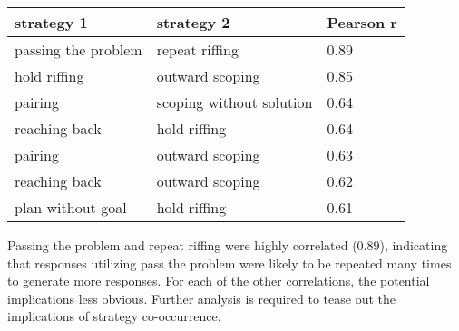 \begin{table}
    \begin{tabular}{l l l}
        \textbf{strategy 1} & \textbf{strategy 2} & \textbf{Pearson r} \\
        \hline
        passing the problem & repeat riffing & 0.89 \\
        hold riffing & outward scoping & 0.85 \\
        pairing & scoping without solution & 0.64 \\
        reaching back & hold riffing & 0.64 \\
        pairing & outward scoping & 0.63 \\
        reaching back & outward scoping & 0.62 \\
        plan without goal & hold riffing & 0.61 \\
    \end{tabular}
\end{table}

Passing the problem and repeat riffing were highly correlated (0.89), indicating that responses utilizing pass the problem were likely to be repeated many times to generate more responses. For each of the other correlations, the potential implications less obvious. Further analysis is required to tease out the implications of strategy co-occurrence.

